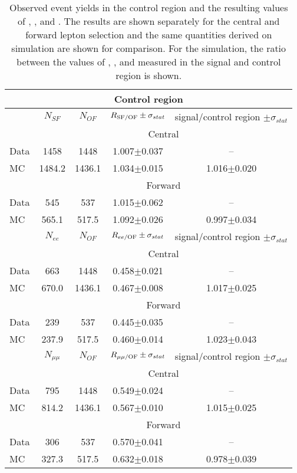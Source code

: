 
\begin{table}[hbtp]
 \renewcommand{\arraystretch}{1.3}
 \setlength{\belowcaptionskip}{6pt}
 \centering
 \caption{Observed event yields in the control region and the resulting values of \Rsfof, \Reeof, and \Rmmof. The results are shown separately for the central and forward lepton selection and the same quantities derived on simulation are shown for comparison. For the simulation, the ratio between the values of \Rsfof, \Reeof, and \Rmmof measured in the signal and control region is shown.}
  \label{tab:rSFOF}
\begin{tabular}{l|c|c|c|c}
\multicolumn{5}{c}{Control region}\\ \hline     
 & $N_{SF}$ & $N_{OF}$ & $ R_{\text{SF/OF}} \pm \sigma_{stat}$ & signal/control region $\pm \sigma_{stat}$  \\    
\hline
&  \multicolumn{4}{c}{Central} \\
\hline
 Data & 1458 & 1448 & 1.007$\pm$0.037 & -- \\
 MC & 1484.2 & 1436.1 & 1.034$\pm$0.015 & 1.016$\pm$0.020\\
 
 
    \hline 
& \multicolumn{4}{c}{Forward} \\
\hline
 Data & 545 & 537 & 1.015$\pm$0.062 & -- \\
 MC & 565.1 & 517.5 & 1.092$\pm$0.026 & 0.997$\pm$0.034\\

\hline\hline
 & $N_{ee}$ & $N_{OF}$ & $ R_\text{$ee$/OF} \pm \sigma_{stat}$ & signal/control region $\pm \sigma_{stat}$  \\    
\hline
&  \multicolumn{4}{c}{Central} \\
\hline
 Data & 663 & 1448 & 0.458$\pm$0.021 & -- \\
 MC & 670.0 & 1436.1 & 0.467$\pm$0.008 & 1.017$\pm$0.025\\
 
 
    \hline 
& \multicolumn{4}{c}{Forward} \\
\hline
 Data & 239 & 537 & 0.445$\pm$0.035 & -- \\
 MC & 237.9 & 517.5 & 0.460$\pm$0.014 & 1.023$\pm$0.043\\

\hline\hline
 & $N_{\mu\mu}$ & $N_{OF}$ & $ R_\text{$\mu\mu$/OF} \pm \sigma_{stat}$ & signal/control region $\pm \sigma_{stat}$  \\    
\hline
& \multicolumn{4}{c}{Central} \\
\hline
 Data & 795 & 1448 & 0.549$\pm$0.024 & -- \\
 MC & 814.2 & 1436.1 & 0.567$\pm$0.010 & 1.015$\pm$0.025\\
 
 
    \hline 
 & \multicolumn{4}{c}{Forward} \\
\hline
 Data & 306 & 537 & 0.570$\pm$0.041 & -- \\
 MC & 327.3 & 517.5 & 0.632$\pm$0.018 & 0.978$\pm$0.039\\

  
\end{tabular}  
\end{table}
